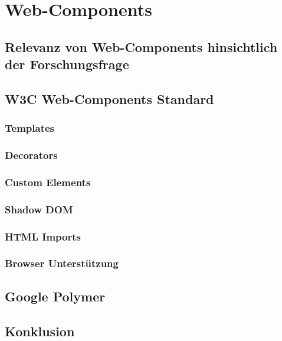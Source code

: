 \section{Web-Components}
\label{sec:3_Web_Components}

\subsection{Relevanz von Web-Components hinsichtlich der Forschungsfrage}
\label{sec:3_Relevanz}

\subsection{W3C Web-Components Standard}
\label{sec:3_W3C}

\subsubsection{Templates}
\label{sec:3_WC_Templates}

\subsubsection{Decorators}
\label{sec:3_WC_Decorators}

\subsubsection{Custom Elements}
\label{sec:3_WC_Elements}

\subsubsection{Shadow DOM}
\label{sec:3_WC_Shadow_DOM}

\subsubsection{HTML Imports}
\label{sec:3_WC_Imports}

\subsubsection{Browser Unterstützung}
\label{sec:3_WC_Support}

\subsection{Google Polymer}
\label{sec:3_Polymer}

\subsection{Konklusion}
\label{sec:3_Konklusion}